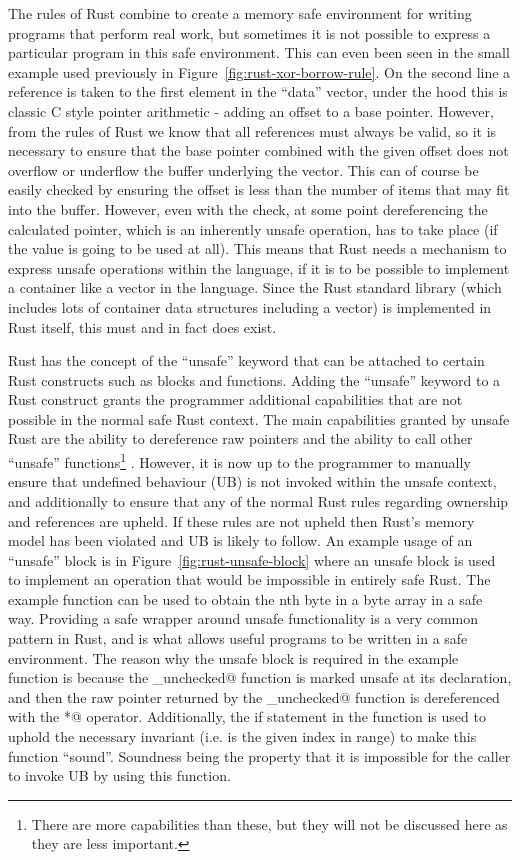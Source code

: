 The rules of Rust combine to create a memory safe environment for writing
programs that perform real work, but sometimes it is not possible to express a
particular program in this safe environment. This can even been seen in the
small example used previously in Figure~\ref{fig:rust-xor-borrow-rule}. On the
second line a reference is taken to the first element in the ``data'' vector,
under the hood this is classic C style pointer arithmetic - adding an offset to
a base pointer. However, from the rules of Rust we know that all references
must always be valid, so it is necessary to ensure that the base pointer
combined with the given offset does not overflow or underflow the buffer
underlying the vector. This can of course be easily checked by ensuring the
offset is less than the number of items that may fit into the buffer. However,
even with the check, at some point dereferencing the calculated pointer, which
is an inherently unsafe operation, has to take place (if the value is going to
be used at all). This means that Rust needs a mechanism to express unsafe
operations within the language, if it is to be possible to implement a
container like a vector in the language. Since the Rust standard library (which
includes lots of container data structures including a vector) is implemented
in Rust itself, this must and in fact does exist.

Rust has the concept of the ``unsafe'' keyword that can be attached to certain
Rust constructs such as blocks and functions. Adding the ``unsafe'' keyword to
a Rust construct grants the programmer additional capabilities that are not
possible in the normal safe Rust context. The main capabilities granted by
unsafe Rust are the ability to dereference raw pointers and the ability to call
other ``unsafe'' functions\footnote{There are more capabilities than these, but
they will not be discussed here as they are less important.}
\cite{rust-nomicon}. However, it is now up to the programmer to manually ensure
that undefined behaviour (UB) is not invoked within the unsafe context, and
additionally to ensure that any of the normal Rust rules regarding ownership
and references are upheld. If these rules are not upheld then Rust's memory
model has been violated and UB is likely to follow. An example usage of an
``unsafe'' block is in Figure~\ref{fig:rust-unsafe-block} where an unsafe block
is used to implement an operation that would be impossible in entirely safe
Rust. The example function can be used to obtain the nth byte in a byte array
in a safe way. Providing a safe wrapper around unsafe functionality is a very
common pattern in Rust, and is what allows useful programs to be written in a
safe environment. The reason why the unsafe block is required in the example
function is because the \verb@get_unchecked@ function is marked unsafe at its
declaration, and then the raw pointer returned by the \verb@get_unchecked@
function is dereferenced with the \verb@*@ operator. Additionally, the if
statement in the function is used to uphold the necessary invariant (i.e. is
the given index in range) to make this function ``sound''. Soundness being the
property that it is impossible for the caller to invoke UB by using this
function.

